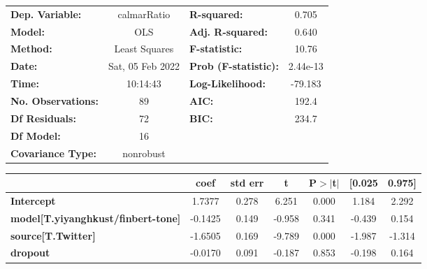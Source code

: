 \begin{center}
\begin{tabular}{lclc}
\toprule
\textbf{Dep. Variable:}                    &   calmarRatio    & \textbf{  R-squared:         } &     0.705   \\
\textbf{Model:}                            &       OLS        & \textbf{  Adj. R-squared:    } &     0.640   \\
\textbf{Method:}                           &  Least Squares   & \textbf{  F-statistic:       } &     10.76   \\
\textbf{Date:}                             & Sat, 05 Feb 2022 & \textbf{  Prob (F-statistic):} &  2.44e-13   \\
\textbf{Time:}                             &     10:14:43     & \textbf{  Log-Likelihood:    } &   -79.183   \\
\textbf{No. Observations:}                 &          89      & \textbf{  AIC:               } &     192.4   \\
\textbf{Df Residuals:}                     &          72      & \textbf{  BIC:               } &     234.7   \\
\textbf{Df Model:}                         &          16      & \textbf{                     } &             \\
\textbf{Covariance Type:}                  &    nonrobust     & \textbf{                     } &             \\
\bottomrule
\end{tabular}
\begin{tabular}{lcccccc}
                                           & \textbf{coef} & \textbf{std err} & \textbf{t} & \textbf{P$> |$t$|$} & \textbf{[0.025} & \textbf{0.975]}  \\
\midrule
\textbf{Intercept}                         &       1.7377  &        0.278     &     6.251  &         0.000        &        1.184    &        2.292     \\
\textbf{model[T.yiyanghkust/finbert-tone]} &      -0.1425  &        0.149     &    -0.958  &         0.341        &       -0.439    &        0.154     \\
\textbf{source[T.Twitter]}                 &      -1.6505  &        0.169     &    -9.789  &         0.000        &       -1.987    &       -1.314     \\
\textbf{dropout}                           &      -0.0170  &        0.091     &    -0.187  &         0.853        &       -0.198    &        0.164     \\

\end{tabular}
\end{center}
